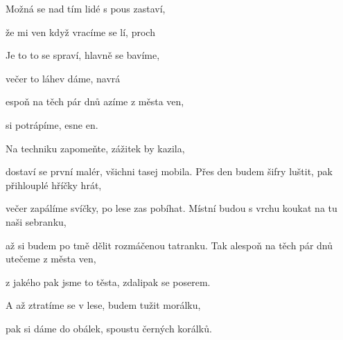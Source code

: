 

\zs

Možná  se nad tím lidé
s pous zastaví,

že mi  ven když vracíme se
lí, proch
\ks

\zs

Je to  to se spraví,
hlavně  se bavíme,

večer  to láhev dáme,
navrá 
\ks

\zr

espoň na těch pár dnů
azíme z města ven,

 si potrápíme,
esne en.
\kr

\zs
Na techniku zapomeňte,
zážitek by kazila,

dostaví se první malér,
všichni tasej mobila.
\ks
\zs
Přes den budem šifry luštit,
pak přihlouplé hříčky hrát,

večer zapálíme svíčky,
po lese zas pobíhat.
\ks
\zs
Místní budou s vrchu koukat
na tu naši sebranku,

až si budem po tmě dělit
rozmáčenou tatranku.
\ks
\zr
Tak alespoň na těch pár dnů
utečeme z města ven,

z jakého pak jsme to těsta,
zdalipak se poserem.
\kr

\zs
A až ztratíme se v lese,
budem tužit morálku,

pak si dáme do obálek,
spoustu černých korálků.
\ks

\kp







